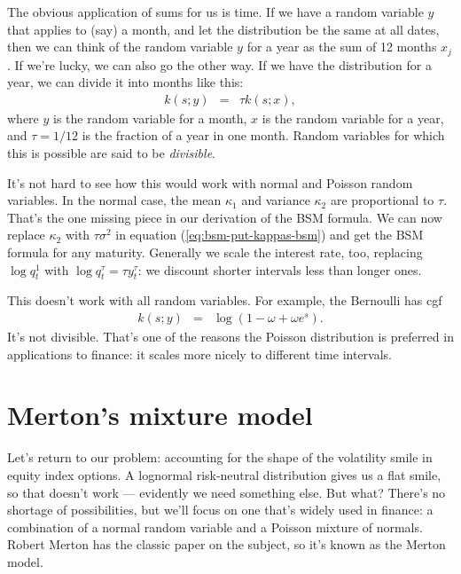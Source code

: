 \documentclass[11pt]{article}
\begin{document}
The obvious application of sums for us is time.
If we have a random variable $y$ that applies to (say) a month,
and let the distribution be the same at all dates,
then we can think of  the random variable $y$ for a year
as the sum of 12 months $x_j$.
If we're lucky, we can also go the other way.
If we have the distribution for a year, we can divide it
into months like this:
\begin{eqnarray*}
    k(s; y) &=&  \tau k(s; x) ,
\end{eqnarray*}
where $y$ is the random variable for a month,
$x$ is the random variable for a year,
and $\tau = 1/12$ is the fraction of a year in one month.
Random variables for which this is possible are said to be {\it divisible\/}.

It's not hard to see how this would work with normal
and Poisson random variables.
In the normal case, the mean $\kappa_1$ and variance $\kappa_2$
are proportional to $\tau$.
That's the one missing piece in our derivation of the BSM formula.
We can now replace $\kappa_2$ with $\tau \sigma^2$
in equation (\ref{eq:bsm-put-kappas-bsm})
and get the BSM formula for any maturity.
Generally we scale the interest rate, too, replacing $ \log q^1_t$
with $\log q^\tau_t = \tau y^\tau_t $:  we discount shorter
intervals less than longer ones.

This doesn't work with all random variables.
For example, the Bernoulli has cgf
\begin{eqnarray*}
    k(s; y) &=& \log \left( 1-\omega + \omega e^s \right) .
\end{eqnarray*}
It's not divisible.
That's one of the reasons the Poisson distribution is preferred in applications
to finance:  it scales more nicely to different time intervals.


\section{Merton's mixture model}
\label{sec:merton}

Let's return to our problem:  accounting for the
shape of the volatility smile in equity index options.
A lognormal risk-neutral distribution gives us a flat smile,
so that doesn't work ---
evidently we need something else.
But what?
There's no shortage of possibilities, but we'll focus on one that's widely used in finance:
a combination of a normal random variable and a Poisson mixture of normals.
Robert Merton has the classic paper on the subject,
so it's known as the Merton model.
\end{document}
